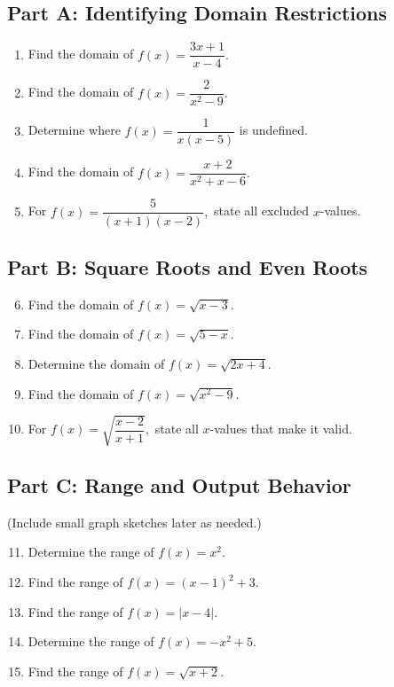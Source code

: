 \documentclass[12pt]{article}
\begin{document}
\subsection*{Part A: Identifying Domain Restrictions}
\begin{enumerate}
  \item Find the domain of \(f(x) = \dfrac{3x + 1}{x - 4}.\)
  \item Find the domain of \(f(x) = \dfrac{2}{x^2 - 9}.\)
  \item Determine where \(f(x) = \dfrac{1}{x(x - 5)}\) is undefined.
  \item Find the domain of \(f(x) = \dfrac{x + 2}{x^2 + x - 6}.\)
  \item For \(f(x) = \dfrac{5}{(x + 1)(x - 2)},\) state all excluded \(x\)-values.
\end{enumerate}

\subsection*{Part B: Square Roots and Even Roots}
\begin{enumerate}
  \setcounter{enumi}{5}
  \item Find the domain of \(f(x) = \sqrt{x - 3}.\)
  \item Find the domain of \(f(x) = \sqrt{5 - x}.\)
  \item Determine the domain of \(f(x) = \sqrt{2x + 4}.\)
  \item Find the domain of \(f(x) = \sqrt{x^2 - 9}.\)
  \item For \(f(x) = \sqrt{\dfrac{x - 2}{x + 1}},\) state all \(x\)-values that make it valid.
\end{enumerate}

\subsection*{Part C: Range and Output Behavior}
(Include small graph sketches later as needed.)
\begin{enumerate}
  \setcounter{enumi}{10}
  \item Determine the range of \(f(x) = x^2.\)
  \item Find the range of \(f(x) = (x - 1)^2 + 3.\)
  \item Find the range of \(f(x) = |x - 4|.\)
  \item Determine the range of \(f(x) = -x^2 + 5.\)
  \item Find the range of \(f(x) = \sqrt{x + 2}.\)
\end{enumerate}
\end{document}
